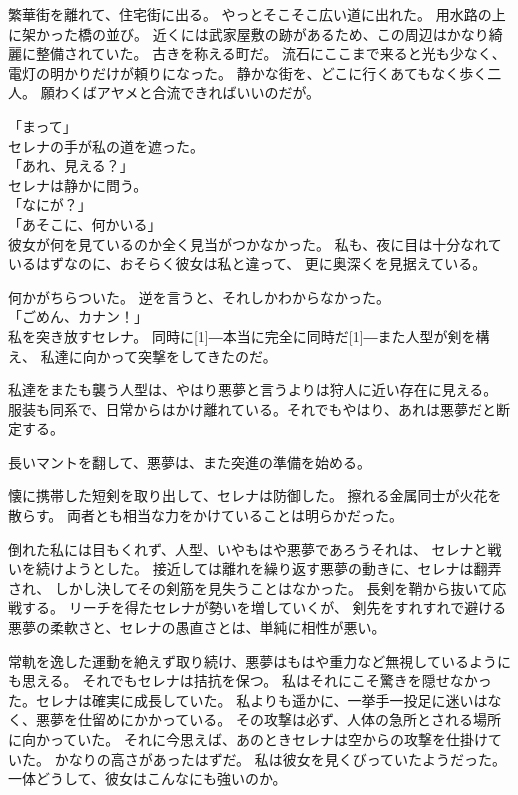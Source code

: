 \documentclass[../IHMain]{subfiles}
\begin{document}
繁華街を離れて、住宅街に出る。
やっとそこそこ広い道に出れた。
用水路の上に架かった橋の並び。
近くには武家屋敷の跡があるため、この周辺はかなり綺麗に整備されていた。
古きを称える町だ。
流石にここまで来ると光も少なく、電灯の明かりだけが頼りになった。
静かな街を、どこに行くあてもなく歩く二人。
願わくばアヤメと合流できればいいのだが。

「まって」\\
セレナの手が私の道を遮った。\\
「あれ、見える？」\\
セレナは静かに問う。\\
「なにが？」\\
「あそこに、何かいる」\\
彼女が何を見ているのか全く見当がつかなかった。
私も、夜に目は十分なれているはずなのに、おそらく彼女は私と違って、
更に奥深くを見据えている。

何かがちらついた。
逆を言うと、それしかわからなかった。\\
「ごめん、カナン！」\\
私を突き放すセレナ。
同時に\scalebox{3}[1]{―}本当に完全に同時だ\scalebox{3}[1]{―}また人型が剣を構え、
私達に向かって突撃をしてきたのだ。

私達をまたも襲う人型は、やはり悪夢と言うよりは狩人に近い存在に見える。
服装も同系で、日常からはかけ離れている。それでもやはり、あれは悪夢だと断定する。

長いマントを翻して、悪夢は、また突進の準備を始める。

懐に携帯した短剣を取り出して、セレナは防御した。
擦れる金属同士が火花を散らす。
両者とも相当な力をかけていることは明らかだった。

倒れた私には目もくれず、人型、いやもはや悪夢であろうそれは、
セレナと戦いを続けようとした。
接近しては離れを繰り返す悪夢の動きに、セレナは翻弄され、
しかし決してその剣筋を見失うことはなかった。
長剣を鞘から抜いて応戦する。
リーチを得たセレナが勢いを増していくが、
剣先をすれすれで避ける悪夢の柔軟さと、セレナの愚直さとは、単純に相性が悪い。

常軌を逸した運動を絶えず取り続け、悪夢はもはや重力など無視しているようにも思える。
それでもセレナは拮抗を保つ。
私はそれにこそ驚きを隠せなかった。セレナは確実に成長していた。
私よりも遥かに、一挙手一投足に迷いはなく、悪夢を仕留めにかかっている。
その攻撃は必ず、人体の急所とされる場所に向かっていた。
それに今思えば、あのときセレナは空からの攻撃を仕掛けていた。
かなりの高さがあったはずだ。
私は彼女を見くびっていたようだった。
一体どうして、彼女はこんなにも強いのか。
\end{document}
